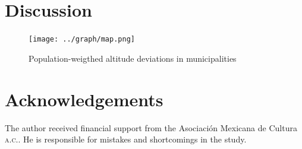 \documentclass[letter,12pt]{article}
\begin{document}





\section{Discussion}

\begin{figure}
  \centering
    \caption{Population-weigthed altitude deviations in municipalities}\label{F:avgMg}
    \texttt{[image: ../graph/map.png]}
\end{figure}


\section*{Acknowledgements}
The author received financial support from the Asociaci\'on Mexicana de Cultura \textsc{a.c.}. He is responsible for mistakes and shortcomings in the study.



%

\end{document}
